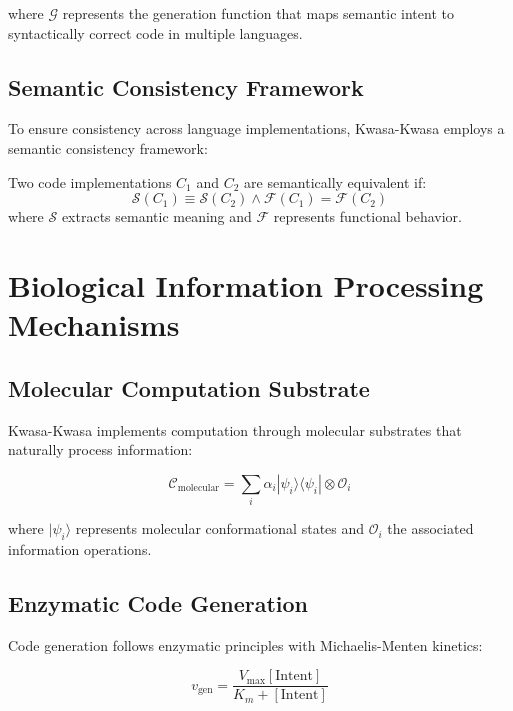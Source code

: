 \documentclass[12pt,a4paper]{article}
\begin{document}
where $\mathcal{G}$ represents the generation function that maps semantic intent to syntactically correct code in multiple languages.

\subsection{Semantic Consistency Framework}

To ensure consistency across language implementations, Kwasa-Kwasa employs a semantic consistency framework:

\begin{definition}
Two code implementations $C_1$ and $C_2$ are semantically equivalent if:
\begin{equation}
\mathcal{S}(C_1) \equiv \mathcal{S}(C_2) \land \mathcal{F}(C_1) = \mathcal{F}(C_2)
\end{equation}
where $\mathcal{S}$ extracts semantic meaning and $\mathcal{F}$ represents functional behavior.
\end{definition}

\section{Biological Information Processing Mechanisms}

\subsection{Molecular Computation Substrate}

Kwasa-Kwasa implements computation through molecular substrates that naturally process information:

\begin{equation}
\mathcal{C}_{\text{molecular}} = \sum_{i} \alpha_i |\psi_i\rangle \langle\psi_i| \otimes \mathcal{O}_i
\end{equation}

where $|\psi_i\rangle$ represents molecular conformational states and $\mathcal{O}_i$ the associated information operations.

\subsection{Enzymatic Code Generation}

Code generation follows enzymatic principles with Michaelis-Menten kinetics:

\begin{equation}
v_{\text{gen}} = \frac{V_{\text{max}}[\text{Intent}]}{K_m + [\text{Intent}]}
\end{equation}
\end{document}
